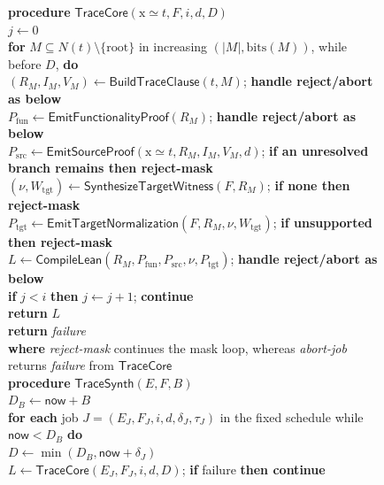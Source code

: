 \documentclass[runningheads]{llncs}
\begin{document}
\begin{figure}[!t]
\centering
\begin{minipage}{0.93\linewidth}
\small
\textbf{procedure} $\mathsf{TraceCore}(\mathrm{x}\simeq t,F,i,d,D)$\\
\quad $j\leftarrow0$\\
\quad \textbf{for} $M\subseteq N(t)\setminus\{\mathrm{root}\}$ in
      increasing $(|M|,\mathrm{bits}(M))$, while before $D$, \textbf{do}\\
\qquad $(R_M,I_M,V_M)\leftarrow\mathsf{BuildTraceClause}(t,M)$;
      \textbf{handle reject/abort as below}\\
\qquad $P_{\mathrm{fun}}\leftarrow
      \mathsf{EmitFunctionalityProof}(R_M)$;
      \textbf{handle reject/abort as below}\\
\qquad $P_{\mathrm{src}}\leftarrow
      \mathsf{EmitSourceProof}(\mathrm{x}\simeq t,R_M,I_M,V_M,d)$;
      \textbf{if an unresolved branch remains then reject-mask}\\
\qquad $(\nu,W_{\mathrm{tgt}})\leftarrow
      \mathsf{SynthesizeTargetWitness}(F,R_M)$;
      \textbf{if none then reject-mask}\\
\qquad $P_{\mathrm{tgt}}\leftarrow
      \mathsf{EmitTargetNormalization}(F,R_M,\nu,W_{\mathrm{tgt}})$;
      \textbf{if unsupported then reject-mask}\\
\qquad $L\leftarrow\mathsf{CompileLean}
      (R_M,P_{\mathrm{fun}},P_{\mathrm{src}},
       \nu,P_{\mathrm{tgt}})$;
      \textbf{handle reject/abort as below}\\
\qquad \textbf{if} $j<i$ \textbf{then} $j\leftarrow j+1$;
      \textbf{continue}\\
\qquad \textbf{return} $L$\\
\quad \textbf{return} \emph{failure}\\[2pt]
\textbf{where} \emph{reject-mask} continues the mask loop, whereas
      \emph{abort-job} returns \emph{failure} from $\mathsf{TraceCore}$\\[2pt]
\textbf{procedure} $\mathsf{TraceSynth}(E,F,B)$\\
\quad $D_B\leftarrow\mathsf{now}+B$\\
\quad \textbf{for each} job $J=(E_J,F_J,i,d,\delta_J,\tau_J)$ in the fixed
      schedule while $\mathsf{now}<D_B$ \textbf{do}\\
\qquad $D\leftarrow\min(D_B,\mathsf{now}+\delta_J)$\\
\qquad $L\leftarrow\mathsf{TraceCore}(E_J,F_J,i,d,D)$;
      \textbf{if} failure \textbf{then continue}\\

\end{minipage}
\end{figure}
\end{document}
